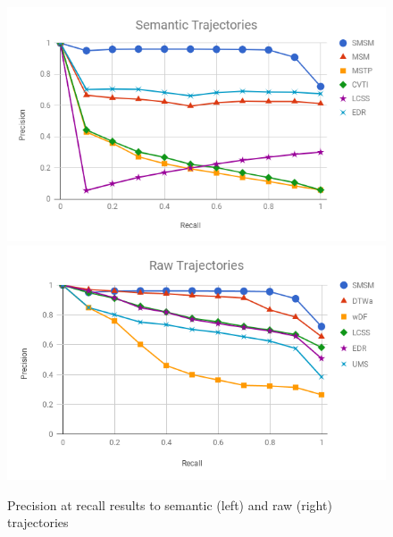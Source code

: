\documentclass[12pt]{article}
\begin{document}
\begin{figure}[ht!]
\centerline{
\centering
\includegraphics[width=.55\textwidth]{Images/new_P_R-chart_Geolife.png}
\includegraphics[width=.55\textwidth]{Images/new_P_R-chart_Geolife-raw.png}
}
\caption{Precision at recall results to semantic (left) and raw (right) trajectories}
\label{fig:geolife_precision_recall}
\end{figure}
\end{document}
